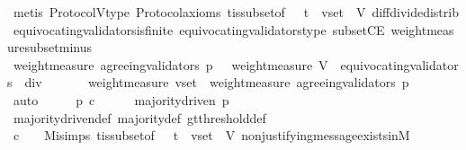\begin{isabellebody}
\ {\isacharparenleft}metis\ Protocol{\isachardot}V{\isacharunderscore}type\ Protocol{\isacharunderscore}axioms\ {\isasymSigma}t{\isacharunderscore}is{\isacharunderscore}subset{\isacharunderscore}of{\isacharunderscore}{\isasymSigma}\ {\isacartoucheopen}{\isasymsigma}\ {\isasymin}\ {\isasymSigma}t\ {\isasymand}\ v{\isacharunderscore}set\ {\isasymsubseteq}\ V{\isacartoucheclose}\ diff{\isacharunderscore}divide{\isacharunderscore}distrib\ equivocating{\isacharunderscore}validators{\isacharunderscore}is{\isacharunderscore}finite\ equivocating{\isacharunderscore}validators{\isacharunderscore}type\ subsetCE\ weight{\isacharunderscore}measure{\isacharunderscore}subset{\isacharunderscore}minus{\isacharparenright}\isanewline
\ \ \isamarkupfalse%
\ \isamarkupfalse%
\ {\isachardoublequoteopen}weight{\isacharunderscore}measure\ {\isacharparenleft}agreeing{\isacharunderscore}validators\ {\isacharparenleft}p{\isacharcomma}\ {\isasymsigma}{\isacharparenright}{\isacharparenright}\ {\isachargreater}\ weight{\isacharunderscore}measure\ {\isacharparenleft}V\ {\isacharminus}\ equivocating{\isacharunderscore}validators\ {\isasymsigma}{\isacharparenright}\ div\ {}{\isachardoublequoteclose}\isanewline
\ \ \ \ \isamarkupfalse%
\ {\isacartoucheopen}weight{\isacharunderscore}measure\ v{\isacharunderscore}set\ {\isasymle}\ weight{\isacharunderscore}measure\ {\isacharparenleft}agreeing{\isacharunderscore}validators\ {\isacharparenleft}p{\isacharcomma}\ {\isasymsigma}{\isacharparenright}{\isacharparenright}{\isacartoucheclose}\isanewline
\ \ \ \ \isamarkupfalse%
\ auto\isanewline
\ \ \isamarkupfalse%
\ \isamarkupfalse%
\ {\isachardoublequoteopen}p\ c{\isachardoublequoteclose}\isanewline
\ \ \ \ \isamarkupfalse%
\ {\isacartoucheopen}majority{\isacharunderscore}driven\ p{\isacartoucheclose}\ \isamarkupfalse%
\ majority{\isacharunderscore}driven{\isacharunderscore}def\ majority{\isacharunderscore}def\ gt{\isacharunderscore}threshold{\isacharunderscore}def\isanewline
\ \ \ \ \isamarkupfalse%
\ {\isacartoucheopen}c\ {\isasymin}\ {\isasymepsilon}\ {\isasymsigma}{\isacartoucheclose}\ Mi{\isachardot}simps\ {\isasymSigma}t{\isacharunderscore}is{\isacharunderscore}subset{\isacharunderscore}of{\isacharunderscore}{\isasymSigma}\ {\isacartoucheopen}{\isasymsigma}\ {\isasymin}\ {\isasymSigma}t\ {\isasymand}\ v{\isacharunderscore}set\ {\isasymsubseteq}\ V{\isacartoucheclose}\ non{\isacharunderscore}justifying{\isacharunderscore}message{\isacharunderscore}exists{\isacharunderscore}in{\isacharunderscore}M{\isacharunderscore}{}\isanewline

\end{isabellebody}
